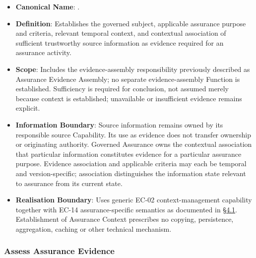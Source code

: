 \begin{itemize}

\item 
\textbf{Canonical Name}: \texttt{}.



\item 
\textbf{Definition}: Establishes the governed subject, applicable assurance purpose and criteria, relevant temporal context, and contextual association of sufficient trustworthy source information as evidence required for an assurance activity.



\item 
\textbf{Scope}: Includes the evidence-assembly responsibility previously described as Assurance Evidence Assembly; no separate evidence-assembly Function is established. Sufficiency is required for conclusion, not assumed merely because context is established; unavailable or insufficient evidence remains explicit.



\item 
\textbf{Information Boundary}: Source information remains owned by its responsible source Capability. Its use as evidence does not transfer ownership or originating authority. Governed Assurance owns the contextual association that particular information constitutes evidence for a particular assurance purpose. Evidence association and applicable criteria may each be temporal and version-specific; association distinguishes the information state relevant to assurance from its current state.



\item 
\textbf{Realisation Boundary}: Uses generic EC-02 context-management capability together with EC-14 assurance-specific semantics as documented in \hyperref[rad:assurance:138]{§4.1}. Establishment of Assurance Context prescribes no copying, persistence, aggregation, caching or other technical mechanism.



\end{itemize}
\label{rad:assurance:106}



\label{rad:assurance:108}
\subsubsection*{Assess Assurance Evidence}
\label{rad:assurance:110}


